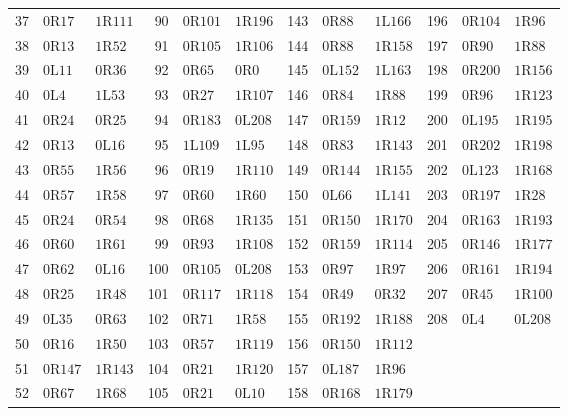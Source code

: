 \begin{longtable}{@{}rll@{\quad}rll@{\quad}rll@{\quad}rll@{}}
37 & $0\mathrm{R}17$ & $1\mathrm{R}111$ & 90 & $0\mathrm{R}101$ & $1\mathrm{R}196$ & 143 & $0\mathrm{R}88$ & $1\mathrm{L}166$ & 196 & $0\mathrm{R}104$ & $1\mathrm{R}96$\\
38 & $0\mathrm{R}13$ & $1\mathrm{R}52$ & 91 & $0\mathrm{R}105$ & $1\mathrm{R}106$ & 144 & $0\mathrm{R}88$ & $1\mathrm{R}158$ & 197 & $0\mathrm{R}90$ & $1\mathrm{R}88$\\
39 & $0\mathrm{L}11$ & $0\mathrm{R}36$ & 92 & $0\mathrm{R}65$ & $0\mathrm{R}0$ & 145 & $0\mathrm{L}152$ & $1\mathrm{L}163$ & 198 & $0\mathrm{R}200$ & $1\mathrm{R}156$\\
40 & $0\mathrm{L}4$ & $1\mathrm{L}53$ & 93 & $0\mathrm{R}27$ & $1\mathrm{R}107$ & 146 & $0\mathrm{R}84$ & $1\mathrm{R}88$ & 199 & $0\mathrm{R}96$ & $1\mathrm{R}123$\\
41 & $0\mathrm{R}24$ & $0\mathrm{R}25$ & 94 & $0\mathrm{R}183$ & $0\mathrm{L}208$ & 147 & $0\mathrm{R}159$ & $1\mathrm{R}12$ & 200 & $0\mathrm{L}195$ & $1\mathrm{R}195$\\
42 & $0\mathrm{R}13$ & $0\mathrm{L}16$ & 95 & $1\mathrm{L}109$ & $1\mathrm{L}95$ & 148 & $0\mathrm{R}83$ & $1\mathrm{R}143$ & 201 & $0\mathrm{R}202$ & $1\mathrm{R}198$\\
43 & $0\mathrm{R}55$ & $1\mathrm{R}56$ & 96 & $0\mathrm{R}19$ & $1\mathrm{R}110$ & 149 & $0\mathrm{R}144$ & $1\mathrm{R}155$ & 202 & $0\mathrm{L}123$ & $1\mathrm{R}168$\\
44 & $0\mathrm{R}57$ & $1\mathrm{R}58$ & 97 & $0\mathrm{R}60$ & $1\mathrm{R}60$ & 150 & $0\mathrm{L}66$ & $1\mathrm{L}141$ & 203 & $0\mathrm{R}197$ & $1\mathrm{R}28$\\
45 & $0\mathrm{R}24$ & $0\mathrm{R}54$ & 98 & $0\mathrm{R}68$ & $1\mathrm{R}135$ & 151 & $0\mathrm{R}150$ & $1\mathrm{R}170$ & 204 & $0\mathrm{R}163$ & $1\mathrm{R}193$\\
46 & $0\mathrm{R}60$ & $1\mathrm{R}61$ & 99 & $0\mathrm{R}93$ & $1\mathrm{R}108$ & 152 & $0\mathrm{R}159$ & $1\mathrm{R}114$ & 205 & $0\mathrm{R}146$ & $1\mathrm{R}177$\\
47 & $0\mathrm{R}62$ & $0\mathrm{L}16$ & 100 & $0\mathrm{R}105$ & $0\mathrm{L}208$ & 153 & $0\mathrm{R}97$ & $1\mathrm{R}97$ & 206 & $0\mathrm{R}161$ & $1\mathrm{R}194$\\
48 & $0\mathrm{R}25$ & $1\mathrm{R}48$ & 101 & $0\mathrm{R}117$ & $1\mathrm{R}118$ & 154 & $0\mathrm{R}49$ & $0\mathrm{R}32$ & 207 & $0\mathrm{R}45$ & $1\mathrm{R}100$\\
49 & $0\mathrm{L}35$ & $0\mathrm{R}63$ & 102 & $0\mathrm{R}71$ & $1\mathrm{R}58$ & 155 & $0\mathrm{R}192$ & $1\mathrm{R}188$ & 208 & $0\mathrm{L}4$ & $0\mathrm{L}208$\\
50 & $0\mathrm{R}16$ & $1\mathrm{R}50$ & 103 & $0\mathrm{R}57$ & $1\mathrm{R}119$ & 156 & $0\mathrm{R}150$ & $1\mathrm{R}112$ &  &  & \\
51 & $0\mathrm{R}147$ & $1\mathrm{R}143$ & 104 & $0\mathrm{R}21$ & $1\mathrm{R}120$ & 157 & $0\mathrm{L}187$ & $1\mathrm{R}96$ &  &  & \\
52 & $0\mathrm{R}67$ & $1\mathrm{R}68$ & 105 & $0\mathrm{R}21$ & $0\mathrm{L}10$ & 158 & $0\mathrm{R}168$ & $1\mathrm{R}179$ &  &  & \\
\bottomrule
\end{longtable}
\endgroup
